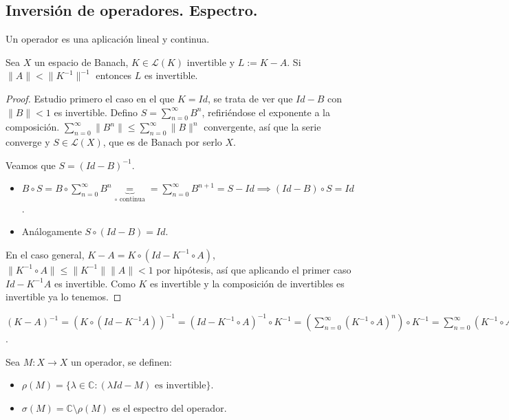 \subsection{Inversión de operadores. Espectro.}
\begin{definition}
  Un operador es una aplicación lineal y continua.
\end{definition}

\begin{theorem}
  \label{th:Von-Neumann}
  Sea $X$ un espacio de Banach, $K\in \mathcal{L}(K)$ invertible y $L:=K-A$. Si
  $\|A\|<\|K^{-1}\|^{-1}$ entonces $L$ es invertible.
\end{theorem}

\begin{proof}
  Estudio primero el caso en el que $K=Id$, se trata de ver que  $Id-B$ con
  $\|B\|<1$ es invertible. Defino $S=\sum_{n=0}^{\infty} B^n$, refiriéndose el
  exponente a la composición. $\sum_{n=0}^{\infty} \|B^n\|\le
  \sum_{n=0}^{\infty} \|B\|^n$ convergente, así que la serie converge y $S\in
  \mathcal{L}(X)$, que es de Banach por serlo $X$.

  Veamos que $S=(Id-B)^{-1}$.

  \begin{itemize}
    \item $B\circ S=B\circ \sum_{n=0}^{\infty} B^n
      \underbrace{=}_{\circ \text{ continua}}=\sum_{n=0}^{\infty}
      B^{n+1}=S-Id\implies(Id-B)\circ S=Id$.
    \item Análogamente $S\circ (Id-B)=Id$.
  \end{itemize}

  En el caso general, $K-A=K\circ (Id-K^{-1}\circ A)$, $\|K^{-1}\circ A\|\le
  \|K^{-1}\|\|A\|<1$ por hipótesis, así que aplicando el primer caso
  $Id-K^{-1}A$ es invertible. Como $K$ es invertible y la composición de
  invertibles es invertible ya lo tenemos.
\end{proof}

\begin{remark}
  \label{rem:inverse-formula}
  $(K-A)^{-1}=(K\circ (Id-K^{-1}A))^{-1}=(Id-K^{-1}\circ A)^{-1}\circ
  K^{-1}=\left( \sum_{n=0}^{\infty} (K^{-1}\circ A)^n \right) \circ
  K^{-1}=\sum_{n=0}^{\infty} (K^{-1}\circ A)^n K^{-1}$.
\end{remark}

\begin{definition}
  Sea $M:X\to X$ un operador, se definen:
  \begin{itemize}
    \item $\rho(M)=\{\lambda\in \mathbb{C}:(\lambda Id-M) \text{ es
      invertible}\} $.
    \item $\sigma(M)=\mathbb{C}\setminus \rho(M)$ es el espectro del operador.
  \end{itemize}
\end{definition}

